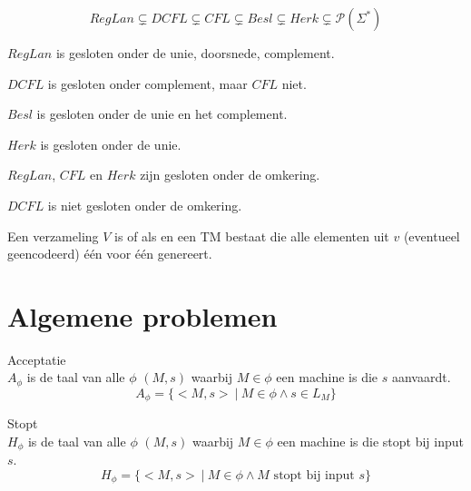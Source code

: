 \documentclass[main.tex]{subfiles}
\begin{document}
\begin{st}
  \[ RegLan \subsetneq DCFL \subsetneq CFL \subsetneq Besl \subsetneq Herk \subsetneq \mathcal{P}(\Sigma^{*}) \]
\end{st}

\begin{st}
  $RegLan$ is gesloten onder de unie, doorsnede, complement.
\end{st}

\begin{st}
  $DCFL$ is gesloten onder complement, maar $CFL$ niet. 
\end{st}

\begin{st}
  $Besl$ is gesloten onder de unie en het complement.
\end{st}

\begin{st}
  $Herk$ is gesloten onder de unie.
\end{st}

\begin{st}
  $RegLan$, $CFL$ en $Herk$ zijn gesloten onder de omkering.
\end{st}

\begin{st}
  $DCFL$ is niet gesloten onder de omkering.
\end{st}

\begin{de}
  Een verzameling $V$ is  of  als en een TM bestaat die alle elementen uit $v$ (eventueel geencodeerd) \'e\'en voor \'e\'en genereert.
\end{de}

\section{Algemene problemen}
\label{sec:algemene-problemen}

\begin{de}
  Acceptatie\\
  $A_{\phi}$ is de taal van alle $\phi$ $(M,s)$ waarbij $M\in \phi$ een machine is die $s$ aanvaardt.
  \[ A_{\phi} = \{ <M,s> \ |\ M\in \phi \wedge s \in L_{M} \} \]
\end{de}

\begin{de}
  Stopt\\
  $H_{\phi}$ is de taal van alle $\phi$ $(M,s)$ waarbij $M\in \phi$ een machine is die stopt bij input $s$.
  \[ H_{\phi} = \{ <M,s> \ |\ M \in \phi \wedge M \text{ stopt bij input } s \} \]
\end{de}
\end{document}
